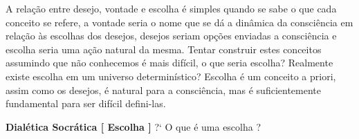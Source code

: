 \documentclass[10pt,a4paper]{report}
\begin{document}
\hspace{\baselineskip}

A relação entre desejo, vontade e escolha é simples quando se sabe o que cada conceito se refere, a vontade seria o nome que se dá a dinâmica da consciência em relação às escolhas dos desejos, desejos seriam opções enviadas a consciência e escolha seria uma ação natural da mesma. Tentar construir estes conceitos assumindo que não conhecemos é mais difícil, o que seria escolha? Realmente existe escolha em um universo determinístico? Escolha é um conceito a priori, assim como os desejos, é natural para a consciência, mas é suficientemente fundamental para ser difícil defini-las.


\hspace{\baselineskip}

\textbf{Dialética Socrática [ Escolha ]} ?` O que é uma escolha ?
\end{document}
